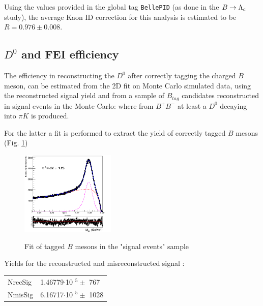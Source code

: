 

\vspace{0.5cm}
Using the values provided in the global tag \texttt{BellePID} (as done in the $B \rightarrow \Lambda_c$ study), the average Kaon ID correction for this analysis is estimated to be $R = 0.976 \pm 0.008$.



\subsection{$D^0$ and FEI efficiency}\label{sec:ControlRecoEff}

The efficiency in reconstructing the $D^0$ after correctly tagging the charged $B$ meson, can be estimated from the 2D fit on Monte Carlo simulated data, using the reconstructed signal yield and from a sample of $B_{tag}$ candidates reconstructed in signal events in the Monte Carlo: where from $B^+ B^-$ at least a $D^0$ decaying into $\pi K$ is produced.

For the latter a fit is performed to extract the yield of correctly tagged $B$ mesons (Fig. \ref{fig:stream0_chargedBtagSignal_fit})
\begin{figure}[H]
\centering
{\includegraphics[width=0.40\textwidth]{05-chargedControlSample/figs/stream0_chargedBtagSignal_fit.png}}
\caption{Fit of tagged $B$ mesons in the "signal events" sample}
\label{fig:stream0_chargedBtagSignal_fit}
\end{figure}

Yields for the reconstructed and misreconstructed signal :

\vspace{0.5 cm}
\begin{tabular}{ |P{2cm}||P{4cm}|  }

 \hline
 NrecSig  & 1.46779$\cdot$10 $^5 \pm$ 767\\
 NmisSig &  6.16717$\cdot$10 $^5 \pm$ 1028 \\
 \hline
\end{tabular}
\vspace{0.5 cm}

